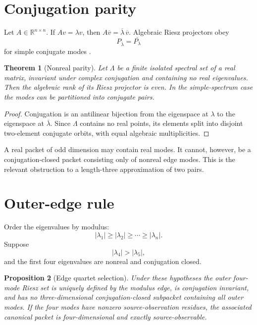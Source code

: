 \documentclass[12pt]{article}
\newtheorem{theorem}{Theorem}[section]
\newtheorem{proposition}[theorem]{Proposition}
\theoremstyle{remark}
\begin{document}
\section{Conjugation parity}

Let $A\in\mathbb R^{n\times n}$.  If $Av=\lambda v$, then
$A\overline v=\overline\lambda\,\overline v$.  Algebraic Riesz projectors
obey
\begin{equation}\label{eq:projector-conjugation}
 P_{\overline\lambda}=\overline{P_\lambda}
\end{equation}
for simple conjugate modes \citep{Kato1995}.

\begin{theorem}[Nonreal parity]\label{thm:parity}
Let $\Lambda$ be a finite isolated spectral set of a real matrix, invariant
under complex conjugation and containing no real eigenvalues.  Then the
algebraic rank of its Riesz projector is even.  In the simple-spectrum case
the modes can be partitioned into conjugate pairs.
\end{theorem}

\begin{proof}
Conjugation is an antilinear bijection from the eigenspace at $\lambda$ to
the eigenspace at $\overline\lambda$.  Since $\Lambda$ contains no real
points, its elements split into disjoint two-element conjugate orbits, with
equal algebraic multiplicities.
\end{proof}

A real packet of odd dimension may contain real modes.  It cannot, however,
be a conjugation-closed packet consisting only of nonreal edge modes.  This
is the relevant obstruction to a length-three approximation of two pairs.

\section{Outer-edge rule}

Order the eigenvalues by modulus:
\begin{equation}\label{eq:modulus-order}
 |\lambda_1|\ge|\lambda_2|\ge\cdots\ge|\lambda_n|.
\end{equation}
Suppose
\begin{equation}\label{eq:edge-gap}
 |\lambda_4|>|\lambda_5|,
\end{equation}
and the first four eigenvalues are nonreal and conjugation closed.

\begin{proposition}[Edge quartet selection]\label{prop:edge}
Under these hypotheses the outer four-mode Riesz set is uniquely defined by
the modulus edge, is conjugation invariant, and has no three-dimensional
conjugation-closed subpacket containing all outer modes.  If the four modes
have nonzero source-observation residues, the associated canonical packet is
four-dimensional and exactly source-observable.
\end{proposition}
\end{document}
